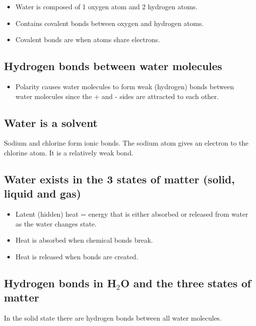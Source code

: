 \begin{itemize}
    \item Water is composed of 1 oxygen atom and 2 hydrogen atoms.
    \item Contains covalent bonds between oxygen and hydrogen atoms.
    \item Covalent bonds are when atoms share electrons.
\end{itemize}

\subsection{Hydrogen bonds between water molecules}

\begin{itemize}
    \item Polarity causes water molecules to form weak (hydrogen)
        bonds between water molecules since the + and - sides are
        attracted to each other.
\end{itemize}

\subsection{Water is a solvent}

Sodium and chlorine form ionic bonds. The sodium atom
gives an electron to the chlorine atom. It is a relatively weak bond.

\subsection{Water exists in the 3 states of matter (solid, liquid and gas)}

\begin{itemize}
    \item Latent (hidden) heat = energy that is either absorbed or released
        from water as the water changes state.
    \item Heat is absorbed when chemical bonds break.
    \item Heat is released when bonds are created.
\end{itemize}

\subsection{Hydrogen bonds in H$_2$O and the three states of matter}

In the solid state there are hydrogen bonds between all water molecules.

